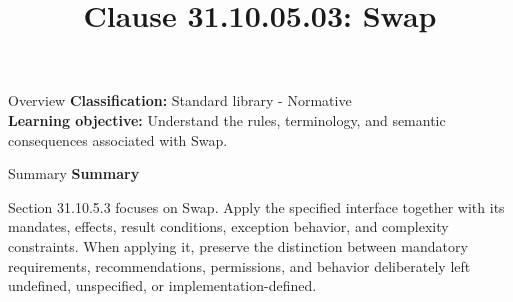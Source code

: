 \documentclass[10pt,letterpaper]{article}
\title{Clause 31.10.05.03: Swap}
\author{}
\date{}
\begin{document}
\maketitle
\begin{CornellOverviewBox}{Overview}
\textbf{Classification:} Standard library - Normative\\[2pt]
\textbf{Learning objective:} Understand the rules, terminology, and semantic consequences associated with Swap.
\end{CornellOverviewBox}\begin{CornellSummaryBox}{Summary}
{\sffamily\bfseries\color{Accent} Summary}\par\vspace{3pt}Section 31.10.5.3 focuses on Swap. Apply the specified interface together with its mandates, effects, result conditions, exception behavior, and complexity constraints. When applying it, preserve the distinction between mandatory requirements, recommendations, permissions, and behavior deliberately left undefined, unspecified, or implementation-defined.
\end{CornellSummaryBox}
\end{document}
